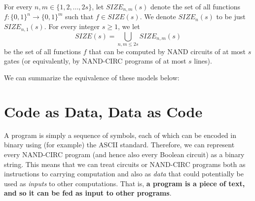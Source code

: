 \documentclass{article}
\begin{document}
  \begin{definition}
  For every $n, m \in \{1, 2, ..., 2s\}$, let $SIZE_{n, m} (s)$ denote the set of all functions $f: \{0,1\}^n \longrightarrow \{0,1\}^m$ such that $f \in SIZE(s)$. We denote $SIZE_n (s)$ to be just $SIZE_{n,1} (s)$. For every integer $s \geq 1$, we let 
  \[SIZE(s) = \bigcup_{n, m \leq 2s} SIZE_{n, m} (s)\]
  be the set of all functions $f$ that can be computed by NAND circuits of at most $s$ gates (or equivalently, by NAND-CIRC programs of at most $s$ lines). 
  \end{definition}

  We can summarize the equivalence of these models below: 
  \begin{center}
  \end{center}

\section{Code as Data, Data as Code}

  A program is simply a sequence of symbols, each of which can be encoded in binary using (for example) the ASCII standard. Therefore, we can represent every NAND-CIRC program (and hence also every Boolean circuit) as a binary string. This means that we can treat circuits or NAND-CIRC programs both as instructions to carrying computation and also as \textit{data} that could potentially be used as \textit{inputs} to other computations. That is, \textbf{a program is a piece of text, and so it can be fed as input to other programs}. 
\end{document}

